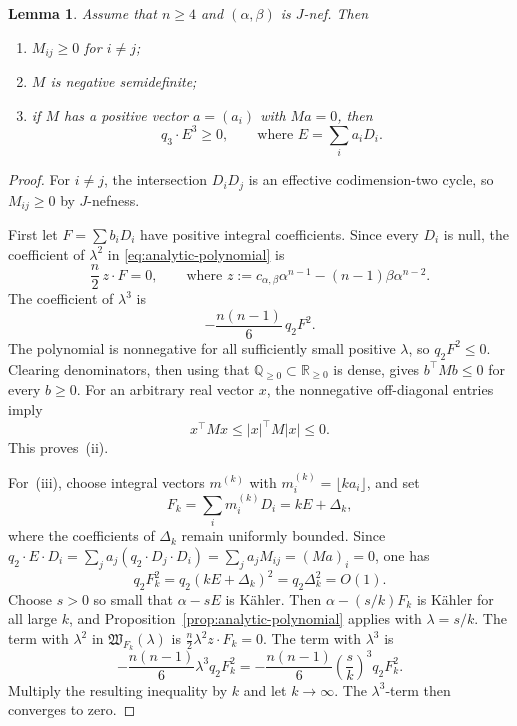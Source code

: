 \documentclass[reqno]{amsart}
\newcommand{\cab}{c_{\alpha,\beta}}
\theoremstyle{plain}
\newtheorem{lemma}[thm]{Lemma}
\theoremstyle{remark}
\begin{document}
\begin{lemma}
\label{lem:matrix-signs}
Assume that $n\geq4$ and $(\alpha,\beta)$ is $J$-nef. Then
\begin{enumerate}[label=\textup{(\roman*)}]
\item $M_{ij}\geq0$ for $i\ne j$;
\item $M$ is negative semidefinite;
\item if $M$ has a positive vector $a=(a_i)$ with $Ma=0$, then
      \begin{equation}\label{eq:cubic-sign}
       q_3\cdot E^3\geq0, \qquad \text{where }E=\sum_i a_iD_i.
      \end{equation}
\end{enumerate}
\end{lemma}
\begin{proof}
For $i\ne j$, the intersection $D_iD_j$ is an effective
codimension-two cycle, so $M_{ij}\geq0$ by $J$-nefness.

First let $F=\sum b_iD_i$ have positive integral coefficients. Since
every $D_i$ is null, the coefficient of $\lambda^2$ in
\eqref{eq:analytic-polynomial} is
\[
 \frac n2\,z\cdot F=0, \qquad \text{where }z:=\cab\alpha^{n-1}-(n-1)\beta\alpha^{n-2}.
\]
The coefficient of $\lambda^3$ is
\[
 -\frac{n(n-1)}6\,q_2F^2.
\]
The polynomial is nonnegative for all sufficiently small positive
$\lambda$, so $q_2F^2\leq0$. Clearing denominators, then  using that $\mathbb{Q}_{\geq0}\subset \mathbb{R}_{\geq0} $ is dense,  gives $b^\top M b\leq0$ for every $b\geq0$. For an
arbitrary real vector $x$,
the nonnegative off-diagonal entries imply
\[
 x^\top Mx\leq |x|^\top M|x|\leq0.
\]
This proves~\textup{(ii)}.

For~\textup{(iii)}, choose integral vectors $m^{(k)}$ with
$m_i^{(k)}=\lfloor ka_i\rfloor$, and set
\[
 F_k=\sum_i m_i^{(k)}D_i=kE+\Delta_k,
\]
where the coefficients of $\Delta_k$ remain uniformly bounded.  Since
$q_2\cdot E\cdot D_i=\sum_j a_j(q_2\cdot D_j\cdot D_i)
=\sum_j a_jM_{ij}=(Ma)_i=0$, one has
\[
 q_2F_k^2=q_2(kE+\Delta_k)^2=q_2\Delta_k^2=O(1).
\]
Choose $s>0$ so small that $\alpha-sE$ is K\"ahler.  Then
$\alpha-(s/k)F_k$ is K\"ahler for all large $k$, and
Proposition~\ref{prop:analytic-polynomial} applies with
$\lambda=s/k$.
The term with $\lambda^2$ in $\mathfrak{W}_{F_k}(\lambda)$ is
$\frac{n}{2}\lambda^2z\cdot F_k=0$. The term with $\lambda^3$ is
\[
-\frac
{n(n-1)}{6}\lambda^3q_2F_k^2=-\frac
{n(n-1)}{6}\left(\frac{s}{k}\right)^3q_2F_k^2.
\]
Multiply the resulting inequality by $k$ and let $k\to\infty$. The
$\lambda^3$-term then converges to zero.



\end{proof}
\end{document}
